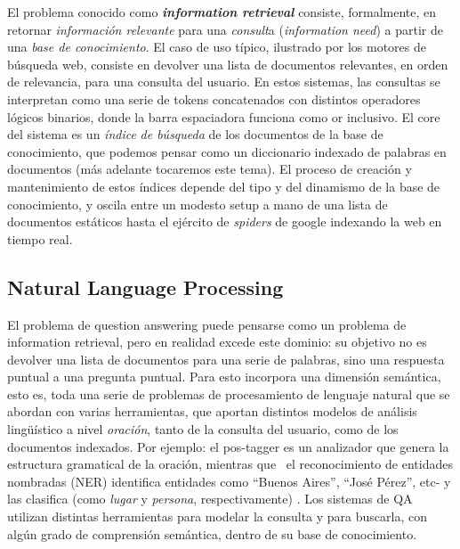 El problema conocido como\textbf{ }\textbf{\textit{information
retrieval}} consiste, formalmente, en retornar \textit{información
relevante} para una \textit{consult}a (\textit{information need}) a
partir de una \textit{base de conocimiento}. El caso de uso típico,
ilustrado por los motores de búsqueda web, consiste en devolver una
lista de documentos relevantes, en orden de relevancia, para una
consulta del usuario. En estos sistemas, las consultas se interpretan
como una serie de tokens concatenados con distintos operadores
lógicos binarios, donde la barra espaciadora funciona como or
inclusivo. El core del sistema es un\textit{ índice} \textit{de
búsqueda} de los documentos de la base de conocimiento, que podemos pensar como 
un diccionario indexado de palabras en documentos (más adelante tocaremos este tema). El
proceso de creación y mantenimiento de estos índices depende del
tipo y del dinamismo de la base de conocimiento, y oscila entre un
modesto setup a mano de una lista de documentos estáticos hasta el
ejército de \textit{spiders} de google indexando la web en tiempo
real. 


\bigskip

\subsection{Natural Language Processing}

El problema de question answering puede pensarse como un problema de information
retrieval, pero en realidad excede este dominio: su objetivo no es devolver una lista de documentos para
una serie de palabras, sino una respuesta puntual a una pregunta
puntual. Para esto incorpora una dimensión semántica, esto es, toda
una serie de problemas de procesamiento de lenguaje natural que se
abordan con varias herramientas, que aportan distintos modelos de
análisis lingüístico a nivel \textit{oración}, tanto de la
consulta del usuario, como de los documentos indexados. Por ejemplo: el
pos-tagger es un analizador que genera la estructura gramatical de la
oración, mientras que \ el reconocimiento de entidades nombradas
(NER) identifica entidades como {\textquotedblleft}Buenos
Aires{\textquotedblright}, {\textquotedblleft}José
Pérez{\textquotedblright}, etc- y las clasifica (como \textit{lugar}
y \textit{persona}, respectivamente) . Los sistemas de QA utilizan
distintas herramientas para modelar la consulta y para buscarla, con
algún grado de comprensión semántica, dentro de su base de
conocimiento.


\bigskip

